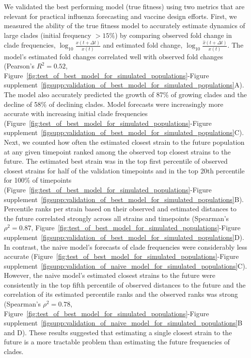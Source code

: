 We validated the best performing model (true fitness) using two metrics that are relevant for practical influenza forecasting and vaccine design efforts.
First, we measured the ability of the true fitness model to accurately estimate dynamics of large clades (initial frequency $>15\%$) by comparing observed fold change in clade frequencies, $\log_{10}{\frac{x(t + \Delta{t})}{x(t)}}$ and estimated fold change, $\log_{10}{\frac{\hat{x}(t + \Delta{t})}{x(t)}}$.
The model's estimated fold changes correlated well with observed fold changes (Pearson's $R^2 = 0.52$, Figure~\ref{fig:test_of_best_model_for_simulated_populations}-Figure supplement~\ref{figsupp:validation_of_best_model_for_simulated_populations}A).
The model also accurately predicted the growth of 87\% of growing clades and the decline of 58\% of declining clades.
Model forecasts were increasingly more accurate with increasing initial clade frequencies (Figure~\ref{fig:test_of_best_model_for_simulated_populations}-Figure supplement~\ref{figsupp:validation_of_best_model_for_simulated_populations}C).
Next, we counted how often the estimated closest strain to the future population at any given timepoint ranked among the observed top closest strains to the future.
The estimated best strain was in the top first percentile of observed closest strains for half of the validation timepoints and in the top 20th percentile for 100\% of timepoints (Figure~\ref{fig:test_of_best_model_for_simulated_populations}-Figure supplement~\ref{figsupp:validation_of_best_model_for_simulated_populations}B).
Percentile ranks per strain based on their observed and estimated distances to the future correlated strongly across all strains and timepoints (Spearman's $\rho^2 = 0.87$, Figure~\ref{fig:test_of_best_model_for_simulated_populations}-Figure supplement~\ref{figsupp:validation_of_best_model_for_simulated_populations}D).
In contrast, the naive model's forecasts of clade frequencies were considerably less accurate (Figure~\ref{fig:test_of_best_model_for_simulated_populations}-Figure supplement~\ref{figsupp:validation_of_naive_model_for_simulated_populations}C).
However, the naive model's estimated closest strains to the future were consistently in the top fifth percentile of observed distances to the future and the correlation of its estimated percentile ranks and the observed ranks was strong (Spearman's $\rho^2 = 0.78$, Figure~\ref{fig:test_of_best_model_for_simulated_populations}-Figure supplement~\ref{figsupp:validation_of_naive_model_for_simulated_populations}B and D).
These results suggested that estimating a single closest strain to the future is a more tractable problem than estimating the future frequencies of clades.

